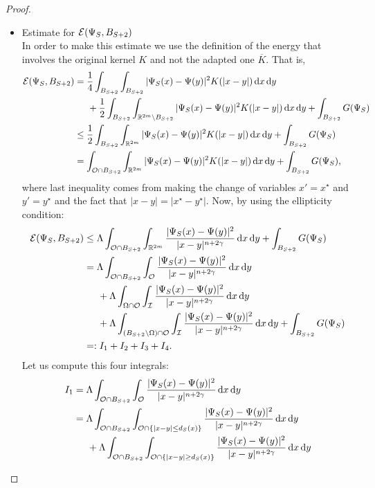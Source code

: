\begin{proof}
\begin{itemize}
\item Estimate for $\mathcal{E}(\Psi_S,B_{S+2})$\\
In order to make this estimate we use the definition of the energy that involves the original kernel $K$ and not the adapted one $\overline{K}$. That is,
\begin{align*}
\mathcal{E}(\Psi_S,B_{S+2}) &= \frac{1}{4} \int_{B_{S+2}} \int_{B_{S+2}} |\Psi_S(x)-\Psi(y)|^2K(|x-y|) \,\mathrm{d} x\,\mathrm{d} y \\
&\hspace{5mm} +\frac{1}{2} \int_{B_{S+2}} \int_{\mathbb{R}^{2m} \setminus B_{S+2}} |\Psi_S(x)-\Psi(y)|^2K(|x-y|) \,\mathrm{d} x\,\mathrm{d} y + \int_{B_{S+2}} G(\Psi_S) \\
&\leq \frac{1}{2} \int_{B_{S+2}} \int_{\mathbb{R}^{2m}} |\Psi_S(x)-\Psi(y)|^2K(|x-y|) \,\mathrm{d} x\,\mathrm{d} y + \int_{B_{S+2}} G(\Psi_S) \\
&= \int_{\mathcal{O} \cap B_{S+2}} \int_{\mathbb{R}^{2m}} |\Psi_S(x)-\Psi(y)|^2K(|x-y|) \,\mathrm{d} x\,\mathrm{d} y + \int_{B_{S+2}} G(\Psi_S),
\end{align*}
where last inequality comes from making the change of variables $x'=x^\star$ and $y'=y^\star$ and the fact that $|x-y|=|x^\star-y^\star|$. Now, by using the ellipticity condition:
\begin{align*}
\mathcal{E}(\Psi_S,B_{S+2}) &\leq \Lambda \int_{\mathcal{O} \cap B_{S+2}} \int_{\mathbb{R}^{2m}} \frac{|\Psi_S(x)-\Psi(y)|^2}{|x-y|^{n+2\gamma}} \,\mathrm{d} x\,\mathrm{d} y + \int_{B_{S+2}} G(\Psi_S)\\
&= \Lambda \int_{\mathcal{O} \cap B_{S+2}} \int_{\mathcal{O}} \frac{|\Psi_S(x)-\Psi(y)|^2}{|x-y|^{n+2\gamma}} \,\mathrm{d} x\,\mathrm{d} y \\
&\hspace{5mm} + \Lambda \int_{\Omega \cap \mathcal{O}} \int_{\mathcal{I}} \frac{|\Psi_S(x)-\Psi(y)|^2}{|x-y|^{n+2\gamma}} \,\mathrm{d} x\,\mathrm{d} y \\
&\hspace{5mm} + \Lambda \int_{(B_{S+2}\setminus \Omega) \cap \mathcal{O}} \int_{\mathcal{I}} \frac{|\Psi_S(x)-\Psi(y)|^2}{|x-y|^{n+2\gamma}} \,\mathrm{d} x\,\mathrm{d} y + \int_{B_{S+2}} G(\Psi_S) \\
&=:I_1+I_2+I_3+I_4.
\end{align*}
Let us compute this four integrals:
\begin{align*}
I_1 &= \Lambda \int_{\ocal \cap B_{S+2}} \int_{\ocal} \frac{|\Psi_S(x)-\Psi(y)|^2}{|x-y|^{n+2\s}} \d x\d y\\
&= \Lambda \int_{\ocal \cap B_{S+2}} \int_{\ocal\cap\{|x-y|\leq d_S(x)\}} \frac{|\Psi_S(x)-\Psi(y)|^2}{|x-y|^{n+2\s}} \d x\d y\\
&\hspace{5mm} + \Lambda \int_{\ocal \cap B_{S+2}} \int_{\ocal\cap\{|x-y|\geq d_S(x)\}} \frac{|\Psi_S(x)-\Psi(y)|^2}{|x-y|^{n+2\s}} \d x\d y\\

\end{align*}
\end{itemize}
\end{proof}
